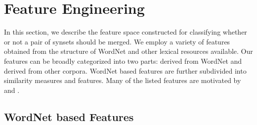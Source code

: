\section{Feature Engineering}
\label{section:featureEngineering}
In this section, we describe the feature space constructed for classifying whether or not a pair of synsets should be merged. We employ a variety of features obtained from the structure of WordNet and other lexical resources available. Our features can be broadly categorized into two parts: derived from WordNet and derived from other corpora.  WordNet based features are further subdivided into similarity measures and features. 
Many of the listed features are motivated by \citep{snow07mergesense} and \citep{Mihalcea01ez.wordnet:principles}.

\subsection{WordNet based Features}
